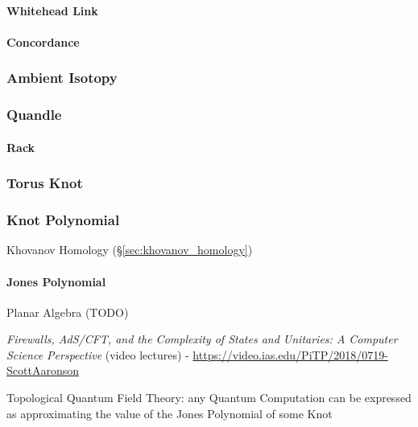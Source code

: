 \paragraph{Whitehead Link} \label{sec:whitehead_link}\hfill

\paragraph{Concordance} \label{sec:concordance}\hfill



\subsubsection{Ambient Isotopy} \label{sec:ambient_isotopy}

\subsubsection{Quandle} \label{sec:quandle}

\paragraph{Rack}\label{sec:rack}\hfill



\subsubsection{Torus Knot} \label{sec:torus_knot}

\subsubsection{Knot Polynomial} \label{sec:knot_polynomial}

\fist Khovanov Homology (\S\ref{sec:khovanov_homology})



\paragraph{Jones Polynomial} \label{sec:jones_polynomial}\hfill

Planar Algebra (TODO)

\asterism

\emph{Firewalls, AdS/CFT, and the Complexity of States and Unitaries: A Computer
  Science Perspective}
(video lectures)
-
\url{https://video.ias.edu/PiTP/2018/0719-ScottAaronson}

Topological Quantum Field Theory: any Quantum Computation can be expressed as
approximating the value of the Jones Polynomial of some Knot



